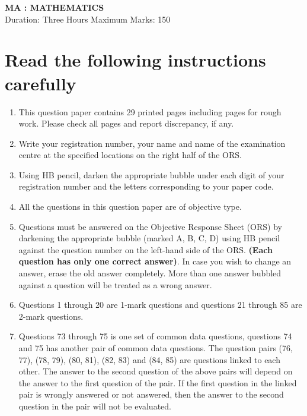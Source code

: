 \documentclass[11pt]{article}
\begin{document}
\begin{center}
    \Large\textbf{MA : MATHEMATICS} \\
    \normalsize Duration: Three Hours \hfill Maximum Marks: 150
\end{center}

\vspace{0.5cm}

\section*{Read the following instructions carefully}

\begin{enumerate}[label=\arabic*.]
    \item This question paper contains 29 printed pages including pages for rough work. Please check all pages and report discrepancy, if any.

    \item Write your registration number, your name and name of the examination centre at the specified locations on the right half of the ORS.

    \item Using HB pencil, darken the appropriate bubble under each digit of your registration number and the letters corresponding to your paper code.

    \item All the questions in this question paper are of objective type.

    \item Questions must be answered on the Objective Response Sheet (ORS) by darkening the appropriate bubble (marked A, B, C, D) using HB pencil against the question number on the left-hand side of the ORS. \textbf{(Each question has only one correct answer)}. In case you wish to change an answer, erase the old answer completely. More than one answer bubbled against a question will be treated as a wrong answer.

    \item Questions 1 through 20 are 1-mark questions and questions 21 through 85 are 2-mark questions.

    \item Questions 73 through 75 is one set of common data questions, questions 74 and 75 has another pair of common data questions. The question pairs (76, 77), (78, 79), (80, 81), (82, 83) and (84, 85) are questions linked to each other. The answer to the second question of the above pairs will depend on the answer to the first question of the pair. If the first question in the linked pair is wrongly answered or not answered, then the answer to the second question in the pair will not be evaluated.


\end{enumerate}
\end{document}
